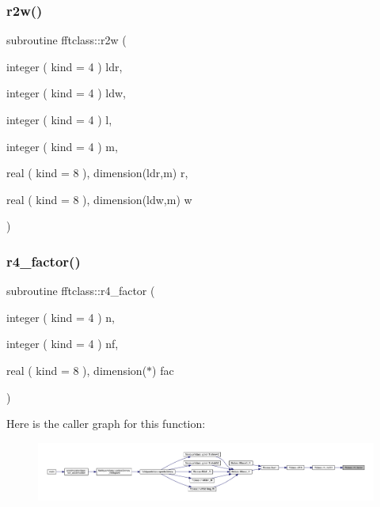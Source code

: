 \subsubsection{\texorpdfstring{r2w()}{r2w()}}
{\footnotesize\ttfamily subroutine fftclass\+::r2w (\begin{DoxyParamCaption}\item[{integer ( kind = 4 )}]{ldr,  }\item[{integer ( kind = 4 )}]{ldw,  }\item[{integer ( kind = 4 )}]{l,  }\item[{integer ( kind = 4 )}]{m,  }\item[{real ( kind = 8 ), dimension(ldr,m)}]{r,  }\item[{real ( kind = 8 ), dimension(ldw,m)}]{w }\end{DoxyParamCaption})}

\mbox{\label{namespacefftclass_ad76d163c3f3aec3b5a3bbb3285498ffd}} 
\subsubsection{\texorpdfstring{r4\_factor()}{r4\_factor()}}
{\footnotesize\ttfamily subroutine fftclass\+::r4\+\_\+factor (\begin{DoxyParamCaption}\item[{integer ( kind = 4 )}]{n,  }\item[{integer ( kind = 4 )}]{nf,  }\item[{real ( kind = 8 ), dimension($\ast$)}]{fac }\end{DoxyParamCaption})}

Here is the caller graph for this function\+:\nopagebreak
\begin{figure}[H]
\begin{center}
\leavevmode
\includegraphics[width=350pt]{namespacefftclass_ad76d163c3f3aec3b5a3bbb3285498ffd_icgraph}
\end{center}
\end{figure}
\mbox{\label{namespacefftclass_aecf4238ff306578dd37cab143ce6efac}} 
